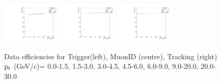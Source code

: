 \documentclass{article}
\begin{document}
\begin{figure}
    \includegraphics[width=0.25\textwidth]{../PlotsRooFitData/eff_trg.pdf}
    \includegraphics[width=0.25\textwidth]{../PlotsRooFitData/eff_id.pdf}
    \includegraphics[width=0.25\textwidth]{../PlotsRooFitData/eff_trk.pdf}
    \caption{Data efficiencies for Trigger(left), MuonID (centre), Tracking (right) 
    $\rm p_{t}$ (GeV/c)= {0.0-1.5}, {1.5-3.0}, {3.0-4.5}, {4.5-6.0}, {6.0-9.0}, {9.0-20.0}, {20.0-30.0}}
\end{figure}
\end{document}
